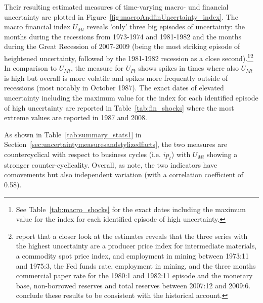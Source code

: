 \documentclass[a4paper,11pt,listof=nochaptergap,oneside,pointednumbers,bibtotoc,bigheadings,liststotoc,hidelinks]{scrbook}
\theoremstyle{mysatz}
\theoremstyle{mydefinition}
\theoremstyle{mytheorem}
\theoremstyle{mybemerkung}
\begin{document}
Their resulting estimated measures of time-varying macro- und financial uncertainty are plotted in Figure~\ref{fig:macroAndfinUncertainty_index}. The macro financial index $U_{Mt}$ reveals 'only' three big episodes of uncertainty: the months during the recessions from 1973-1974 and 1981-1982 and the months during the Great Recession of 2007-2009 (being the most striking episode of heightened uncertainty, followed by the 1981-1982 recession as a close second).\footnote{See Table~\ref{tab:macro_shocks} for the exact dates including the maximum value for the index for each identified episode of high uncertainty.}\footnote{\citet{juradoetal:15} report that a closer look at the estimates reveals that the three series with the highest uncertainty are a producer price index for intermediate materials, a commodity spot price index, and employment in mining between 1973:11 and 1975:3, the Fed funds rate, employment in mining, and the three months commercial paper rate for the 1980:1 and 1982:11 episode and the monetary base, non-borrowed reserves and total reserves between 2007:12 and 2009:6. \citet{juradoetal:15} conclude these results to be consistent with the historical account.} In comparison to $U_{Mt}$, the measure for $U_{Ft}$ shows spikes in times where also $U_{Mt}$ is high but overall is more volatile and spikes more frequently outside of recessions (most notably in October 1987). The exact dates of elevated uncertainty including the maximum value for the index for each identified episode of high uncertainty are reported in Table~\ref{tab:fin_shocks} where the most extreme values are reported in 1987 and 2008.

As shown in Table~\ref{tab:summary_stats1} in Section~\ref{sec:uncertaintymeasuresandstylizedfacts}, the two measures are countercyclical with respect to business cycles (i.e. $ip_t$) with $U_{Mt}$ showing a stronger counter-cyclicality. Overall, as \citet{ludvigsonetal:19} note, the two indicators have comovements but also independent variation (with a correlation coefficient of 0.58). 
\end{document}
